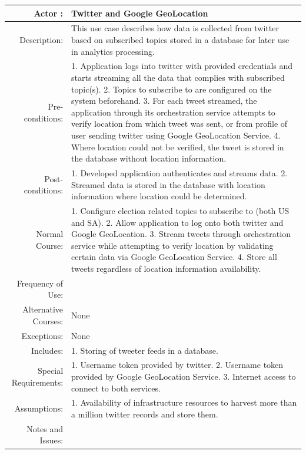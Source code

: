\documentclass[12pt]{article} %
\begin{document}
	  \begin{center}
	  	\begin{tabular}{ | r | p{12cm} |}
	  		\hline
	  		Actor : & Twitter and Google GeoLocation \\
	  		\hline
	  		Description: & This use case describes how data is collected from twitter based on subscribed topics stored in a database for later use in analytics processing.\\
	  		\hline
	  		Pre-conditions: & 1.	Application logs into twitter with provided credentials and starts streaming all the data that complies with subscribed topic(s).
	  		2.	Topics to subscribe to are configured on the system beforehand.
	  		3.	For each tweet streamed, the application through its orchestration service attempts to verify location from which tweet was sent, or from profile of user sending twitter using Google GeoLocation Service.
	  		4.	Where location could not be verified, the tweet is stored in the database without location information.
	  		\\
	  		\hline
	  		Post-conditions: & 1.	Developed application authenticates and streams data.
	  		2.	Streamed data is stored in the database with location information where location could be determined.\\
	  		\hline
	  		Normal Course: & 1.	Configure election related topics to subscribe to (both US and SA).
	  		2.	Allow application to log onto both twitter and Google GeoLocation.
	  		3.	Stream tweets through orchestration service while attempting to verify location by validating certain data via Google GeoLocation Service.
	  		4.	Store all tweets regardless of location information availability.\\
	  		\hline
	  		Frequency of Use: & \\
	  		\hline
	  		Alternative Courses: & None\\
	  		\hline
	  		Exceptions: & None\\
	  		\hline
	  		Includes: & 1.	Storing of tweeter feeds in a database.\\
	  		\hline
	  		Special Requirements: & 1.	Username token provided by twitter.
	  		2.	Username token provided by Google GeoLocation Service.
	  		3.	Internet access to connect to both services.\\
	  		\hline
	  		Assumptions:& 1.	Availability of infrastructure resources to harvest more than a million twitter records and store them.\\
	  		\hline
	  		Notes and Issues: & \\
	  		\hline
	  	\end{tabular}
	  \end{center}
	  
\end{document}
